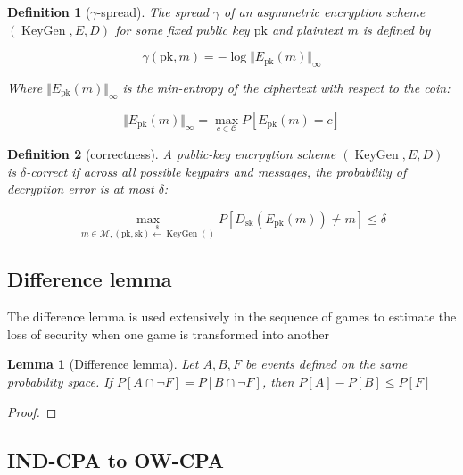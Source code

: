\documentclass{article}
\newcommand{\Norm}[1]{\Vert {#1} \Vert}
\newcommand{\leftsample}{\overset{{\scriptscriptstyle\$}}{\leftarrow}}
\newtheorem{definition}{Definition}[section]
\newtheorem{lemma}{Lemma}
\begin{document}
\begin{definition}[$\gamma$-spread]
    The spread $\gamma$ of an asymmetric encryption scheme $(\operatorname{KeyGen}, E, D)$ for some fixed public key $\text{pk}$ and plaintext $m$ is defined by

    \begin{equation*}
        \gamma(\text{pk}, m) = -\log{\Norm{E_\text{pk}(m)}_\infty}
    \end{equation*}

    Where $\Norm{E_\text{pk}(m)}_\infty$ is the min-entropy of the ciphertext with respect to the coin:

    \begin{equation*}
        \Norm{E_\text{pk}(m)}_\infty 
        = \max_{c \in \mathcal{C}} P[E_\text{pk}(m) = c]
    \end{equation*}
\end{definition}

\begin{definition}[correctness]
    A public-key encrpytion scheme $(\operatorname{KeyGen}, E, D)$ is $\delta$-correct if across all possible keypairs and messages, the probability of decryption error is at most $\delta$:

    \begin{equation*}
        \max_{
            m \in \mathcal{M},
            (\text{pk}, \text{sk}) \leftsample \operatorname{KeyGen}()
        } P[D_\text{sk}(E_\text{pk}(m)) \neq m]
        \leq \delta
    \end{equation*}
\end{definition}

\subsection{Difference lemma}
The difference lemma is used extensively in the sequence of games to estimate the loss of security when one game is transformed into another

\begin{lemma}[Difference lemma]
    Let $A, B, F$ be events defined on the same probability space. If $P[A \cap \neg F] = P[B \cap \neg F]$, then $P[A] - P[B] \leq P[F]$
\end{lemma}

\begin{proof}
    
\end{proof}

\subsection{IND-CPA to OW-CPA}
\end{document}
